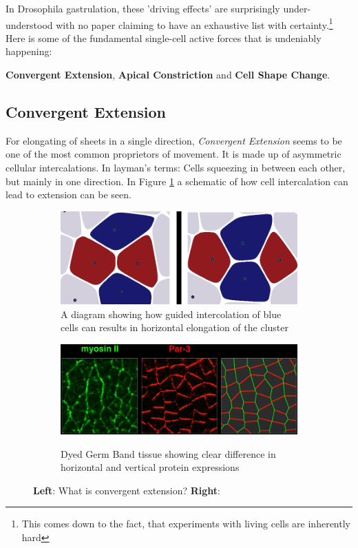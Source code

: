 In Drosophila gastrulation, these 'driving effects' are surprisingly under-understood with no paper claiming to have an exhaustive list with certainty.\footnote{This comes down to the fact, that experiments with living cells are inherently hard} Here is some of the fundamental single-cell active forces that is undeniably happening:

\textbf{Convergent Extension}, \textbf{Apical Constriction} and \textbf{Cell Shape Change}.

\subsection{Convergent Extension}
\label{sec:ConvergentExtension}
For elongating of sheets in a single direction, \textit{Convergent Extension} seems to be one of the most common proprietors of movement. It is made up of asymmetric cellular intercalations. In layman's terms: Cells squeezing in between each other, but mainly in one direction. 
In Figure  \ref{fig:cellIntercolation} a schematic of how cell intercalation can lead to extension can be seen.
\begin{figure}[H]
    \centering
    \begin{subfigure}{0.45\linewidth}
        \centering
    \includegraphics[width=\linewidth]{chapters/Theory/figures/ConvergentExtensionDiagram.png}
    \caption{A diagram showing how guided intercolation of blue cells can results in horizontal elongation of the cluster}
    \label{fig:cellIntercolation}
    \end{subfigure}
        \begin{subfigure}{0.45\linewidth}
        \centering
        \caption{Dyed Germ Band tissue showing clear difference in horizontal and vertical protein expressions}
    \includegraphics[width=\linewidth]{chapters/Theory/figures/bipolar-PCP.png}
    \label{fig:dyedDifferentialWall}
    \end{subfigure}
    \caption{\textbf{Left}: What is convergent extension? \textbf{Right}: }
    
    \label{fig:ConvergentExtensionDiagram}
\end{figure}

